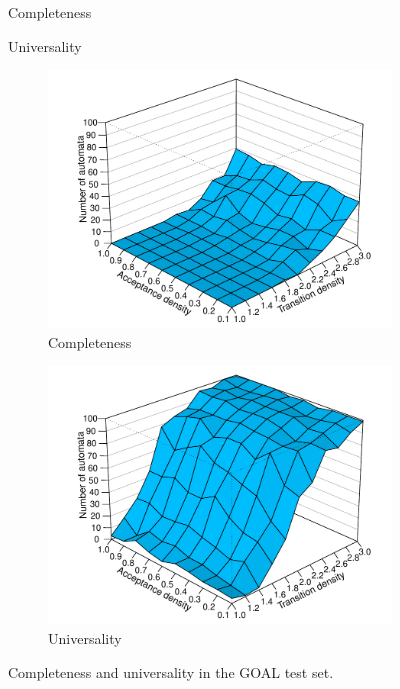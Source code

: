 \begin{figure}
  \centering
  \hfill
  \renewcommand{\tabcolsep}{0.1cm}
  \begin{subtable}[t]{0.45\textwidth}
    \centering
    
    \caption{Completeness}
  \end{subtable}
  \hfill
  \begin{subtable}[t]{0.45\textwidth}
    \centering
    
    \caption{Universality}
  \end{subtable}
  \renewcommand{\tabcolsep}{0.2cm}
  \hfill

  \hfill
  \begin{subfigure}[t]{0.475\textwidth}
    \centering
    \includegraphics[width=\textwidth]{figures/r/completeness/persp.pdf}
    \caption{Completeness}
  \end{subfigure}
  \hfill
  \begin{subfigure}[t]{0.475\textwidth}
    \centering
    \includegraphics[width=\textwidth]{figures/r/universality/persp.pdf}
    \caption{Universality}
  \end{subfigure}
  \hfill
\caption{Completeness and universality in the GOAL test set.}
\label{4_compl_univ}
\end{figure}

